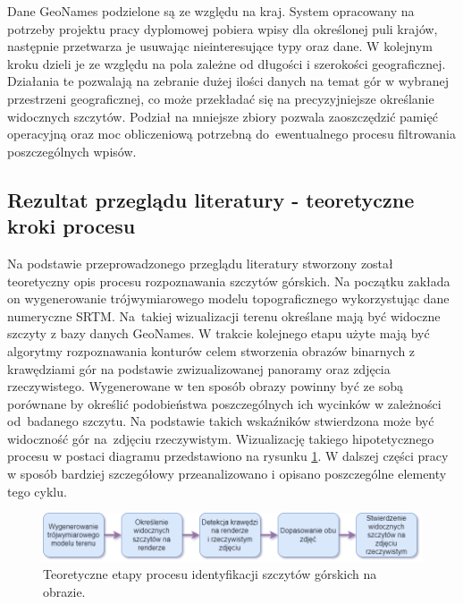 \par

Dane GeoNames podzielone są ze względu na kraj. System opracowany na potrzeby projektu pracy dyplomowej pobiera wpisy dla określonej puli krajów, następnie przetwarza je usuwając nieinteresujące typy oraz dane. W kolejnym kroku dzieli je ze względu na pola zależne od długości i szerokości geograficznej. Działania te pozwalają na zebranie dużej ilości danych na temat gór w wybranej przestrzeni geograficznej, co może przekładać się na precyzyjniejsze określanie widocznych szczytów. Podział na mniejsze zbiory pozwala zaoszczędzić pamięć operacyjną oraz moc obliczeniową potrzebną do~ewentualnego procesu filtrowania poszczególnych wpisów. 


\subsection{Rezultat przeglądu literatury - teoretyczne kroki procesu} \label{section:teoretical_pipeline}


Na podstawie przeprowadzonego przeglądu literatury stworzony został teoretyczny opis procesu rozpoznawania szczytów górskich. Na początku zakłada on wygenerowanie trójwymiarowego modelu topograficznego wykorzystując dane numeryczne SRTM. Na~takiej wizualizacji terenu określane mają być widoczne szczyty z bazy danych GeoNames. W trakcie kolejnego etapu użyte mają być algorytmy rozpoznawania konturów celem stworzenia obrazów binarnych z krawędziami gór na podstawie zwizualizowanej panoramy oraz zdjęcia rzeczywistego. Wygenerowane w ten sposób obrazy powinny być ze sobą porównane by określić podobieństwa poszczególnych ich wycinków w zależności od~badanego szczytu. Na podstawie takich wskaźników stwierdzona może być widoczność gór na~zdjęciu rzeczywistym. Wizualizację takiego hipotetycznego procesu w postaci diagramu przedstawiono na rysunku \ref{fig:teoretical-pipeline}. W dalszej części pracy w sposób bardziej szczegółowy przeanalizowano i opisano poszczególne elementy tego cyklu.

\begin{figure}[!h]
    \centering \includegraphics[width=1.0\linewidth]{img/flowchart_abstrakcja.drawio.png}
    \caption{Teoretyczne etapy procesu identyfikacji szczytów górskich na obrazie.}
    \label{fig:teoretical-pipeline}
\end{figure}

